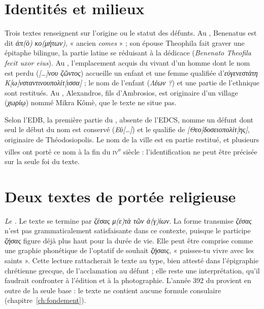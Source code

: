 \section{Identités et milieux}

Trois textes renseignent sur l’origine ou le statut des défunts. Au , Benenatus est dit \emph{ἀπ(ὸ) κο(μήτων)}, « ancien \emph{comes} » ; son épouse Theophila fait graver une épitaphe bilingue, la partie latine se réduisant à la dédicace (\emph{Benenato Theofila fecit uxor eius}). Au , l’emplacement acquis du vivant d’un homme dont le nom est perdu (\emph{[…]νου ζῶντος}) accueille un enfant et une femme qualifiée d’\emph{εὐγενεστάτη Κ[ω]νσταντινουπολίτ[ισσα]} ; le nom de l’enfant (\emph{Λέων ?}) et une partie de l’ethnique sont restitués. Au , Alexandros, fils d’Ambrosios, est originaire d’un village (\emph{χωρίῳ}) nommé Mikra Kômè, que le texte ne situe pas.

Selon l’EDB, la première partie du , absente de l’EDCS, nomme un défunt dont seul le début du nom est conservé (\emph{Εὐ[…]}) et le qualifie de \emph{[Θεο]δοσειοπολίτ[ης]}, originaire de Théodosiopolis. Le nom de la ville est en partie restitué, et plusieurs villes ont porté ce nom à la fin du \textsc{iv}\textsuperscript{e} siècle : l’identification ne peut être précisée sur la seule foi du texte.

\section{Deux textes de portée religieuse}

\emph{Le .} Le texte se termine par \emph{ζέσας μ(ε)τὰ τῶν ἁ(γ)ίων}. La forme transmise \emph{ζέσας} n’est pas grammaticalement satisfaisante dans ce contexte, puisque le participe \emph{ζήσας} figure déjà plus haut pour la durée de vie. Elle peut être comprise comme une graphie phonétique de l’optatif de souhait \emph{ζήσαις}, « puisses-tu vivre avec les saints ». Cette lecture rattacherait le texte au type, bien attesté dans l’épigraphie chrétienne grecque, de l’acclamation au défunt ; elle reste une interprétation, qu’il faudrait confronter à l’édition et à la photographie. L’année 392 du  provient en outre de la seule base : le texte ne contient aucune formule consulaire (chapitre~\ref{ch:fondement}).

